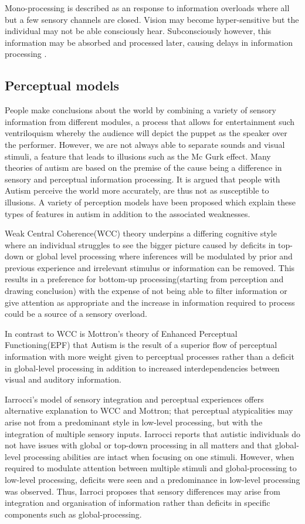 \documentclass[11pt]{report}
\begin{document}
Mono-processing is described as an response to information overloads where all but a few sensory channels are closed. Vision may become hyper-sensitive but the individual may not be able consciously hear. Subconsciously however, this information may be absorbed and processed later, causing delays in information processing \cite{olgab}.  

\subsection{Perceptual models}

People make conclusions about the world by combining a variety of sensory information from different modules, a process that allows for entertainment such ventriloquism whereby the audience will depict the puppet as the speaker over the performer. However, we are not always able to separate sounds and visual stimuli, a feature that leads to illusions such as the Mc Gurk effect. Many theories of autism are based on the premise of the cause being a difference in sensory and perceptual information processing. It is argued that people with Autism perceive the world more accurately, are thus not as susceptible to illusions. A variety of perception models have been proposed which explain these types of features in autism in addition to the associated weaknesses.  

Weak Central Coherence(WCC) theory underpins a differing cognitive style where an individual struggles to see the bigger picture caused by deficits in top-down or global level processing where inferences will be modulated by prior and previous experience and irrelevant stimulus or information can be removed. This results in a preference for bottom-up processing(starting from perception and drawing conclusion) with the expense of not being able to filter information or give attention as appropriate and the increase in information required to process could be a source of a sensory overload. 

In contrast to WCC is Mottron's theory of Enhanced Perceptual Functioning(EPF) that Autism is the result of a superior flow of perceptual information with more weight given to perceptual processes rather than a deficit in global-level processing 
in addition to increased interdependencies between visual and auditory information. 

Iarrocci’s model of sensory integration and perceptual experiences offers alternative explanation to WCC and Mottron; that perceptual atypicalities may arise not from a predominant style in low-level processing, but with the integration of multiple sensory inputs. Iarrocci reports that autistic individuals do not have issues with global or top-down processing in all matters and that global-level processing abilities are intact when focusing on one stimuli. However, when required to modulate attention between multiple stimuli and global-processing to low-level processing, deficits were seen and a predominance in low-level processing was observed. Thus, Iarroci proposes that sensory differences may arise from integration and organisation of information rather than deficits in specific components such as global-processing.
\end{document}
